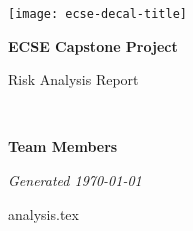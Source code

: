 \documentclass{capstone}
\begin{document}

\titlepage
	{\texttt{[image: ecse-decal-title]}}
	{
		\centering\sffamily
		{\Huge\bfseries ECSE Capstone Project\par}
		\vspace{16pt} 
		{\LARGE Risk Analysis Report \par} 
		\vspace{24pt}
		{\huge\bfseries \teamname\par} %
	}


~\vfill

\noindent \textbf{Team Members}
\teammembers

\noindent \textit{Generated \today}

\cleardoublepage

{analysis.tex}
\end{document}
